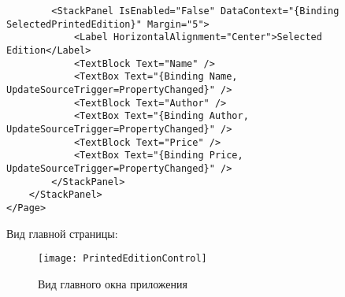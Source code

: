 \documentclass[a4paper,14pt]{extarticle}
\begin{document}
\begin{lstlisting}
        <StackPanel IsEnabled="False" DataContext="{Binding SelectedPrintedEdition}" Margin="5">
            <Label HorizontalAlignment="Center">Selected Edition</Label>
            <TextBlock Text="Name" />
            <TextBox Text="{Binding Name, UpdateSourceTrigger=PropertyChanged}" />
            <TextBlock Text="Author" />
            <TextBox Text="{Binding Author, UpdateSourceTrigger=PropertyChanged}" />
            <TextBlock Text="Price" />
            <TextBox Text="{Binding Price, UpdateSourceTrigger=PropertyChanged}" />
        </StackPanel>
    </StackPanel>
</Page>
\end{lstlisting}

Вид главной страницы:
\begin{figure}[H]
    \centering
    \texttt{[image: PrintedEditionControl]}
    \caption{Вид главного окна приложения}
    \label{fig:printed-edition-control}
\end{figure}
\end{document}
